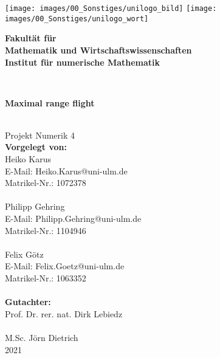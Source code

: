 \documentclass[
a4paper,
10pt,
headsepline,           %
oneside,               %
numbers=noenddot,	   %
bibliography=totoc,    %
]{scrbook}
\makeatletter
\newcommand{\Heiko}{Heiko Karus}
\newcommand{\Philipp}{Philipp Gehring}
\newcommand{\Felix}{Felix Götz}
\newcommand{\Hemail}{Heiko.Karus@uni-ulm.de}
\newcommand{\Pemail}{Philipp.Gehring@uni-ulm.de}
\newcommand{\Femail}{Felix.Goetz@uni-ulm.de}
\newcommand{\Hmatnr}{1072378}
\newcommand{\Pmatnr}{1104946}
\newcommand{\Fmatnr}{1063352}
\newcommand{\titel}{Maximal range flight}
\newcommand{\jahr}{2021}
\newcommand{\gutachterA}{Prof. Dr. rer. nat. Dirk Lebiedz}
\newcommand{\gutachterB}{M.Sc. Jörn Dietrich}
\newcommand{\fakultaet}{Mathematik und Wirtschaftswissenschaften}
\newcommand{\institut}{Institut für numerische Mathematik}
\makeatother
\begin{document}

\frontmatter

\thispagestyle{empty}
\begin{addmargin*}[4mm]{-10mm}

\texttt{[image: images/00\_Sonstiges/unilogo\_bild]}
\hfill
\texttt{[image: images/00\_Sonstiges/unilogo\_wort]}\\[2em]



{\footnotesize
\hspace*{130mm}\parbox[t]{35mm}{
\bfseries Fakultät für\\
\fakultaet\\
\mdseries \institut
}\\[2cm]

\parbox{140mm}{\bfseries \LARGE \titel}\\[2.5em]
{\footnotesize Projekt Numerik 4}\\[2em]

{\footnotesize \bfseries Vorgelegt von:}\\
{\footnotesize \Heiko \\ E-Mail: \Hemail \\ Matrikel-Nr.: \Hmatnr}\\ \\%
{\footnotesize \Philipp \\ E-Mail: \Pemail \\ Matrikel-Nr.: \Pmatnr}\\ \\%
{\footnotesize \Felix \\ E-Mail: \Femail \\ Matrikel-Nr.: \Fmatnr}\\ \\[2em]

{\footnotesize \bfseries Gutachter:}\\                     
{\footnotesize \gutachterA}\\ \\%
{\footnotesize \gutachterB}\\[2em]

{\footnotesize \jahr}
}
\end{addmargin*}
\end{document}
